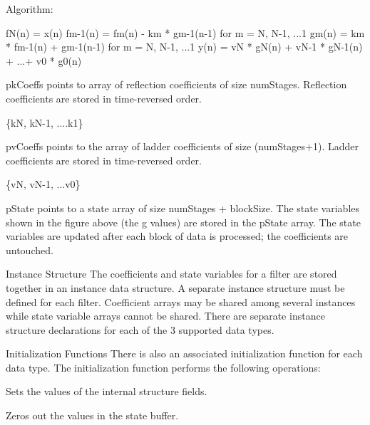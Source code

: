 \begin{DoxyParagraph}{Algorithm\-: }
 
\begin{DoxyPre}    
     fN(n)   =  x(n)    
     fm-1(n) = fm(n) - km * gm-1(n-1)   for m = N, N-1, ...1    
     gm(n)   = km * fm-1(n) + gm-1(n-1) for m = N, N-1, ...1    
     y(n)    = vN * gN(n) + vN-1 * gN-1(n) + ...+ v0 * g0(n)    
  \end{DoxyPre}
 
\end{DoxyParagraph}
\begin{DoxyParagraph}{}
{\ttfamily pk\-Coeffs} points to array of reflection coefficients of size {\ttfamily num\-Stages}. Reflection coefficients are stored in time-\/reversed order. 
\end{DoxyParagraph}
\begin{DoxyParagraph}{}

\begin{DoxyPre}    
     \{kN, kN-1, ....k1\}    
  \end{DoxyPre}
 {\ttfamily pv\-Coeffs} points to the array of ladder coefficients of size {\ttfamily (num\-Stages+1)}. Ladder coefficients are stored in time-\/reversed order. 
\end{DoxyParagraph}
\begin{DoxyParagraph}{}

\begin{DoxyPre}    
     \{vN, vN-1, ...v0\}    
  \end{DoxyPre}
 {\ttfamily p\-State} points to a state array of size {\ttfamily num\-Stages + block\-Size}. The state variables shown in the figure above (the g values) are stored in the {\ttfamily p\-State} array. The state variables are updated after each block of data is processed; the coefficients are untouched. 
\end{DoxyParagraph}
\begin{DoxyParagraph}{Instance Structure }
The coefficients and state variables for a filter are stored together in an instance data structure. A separate instance structure must be defined for each filter. Coefficient arrays may be shared among several instances while state variable arrays cannot be shared. There are separate instance structure declarations for each of the 3 supported data types.
\end{DoxyParagraph}
\begin{DoxyParagraph}{Initialization Functions }
There is also an associated initialization function for each data type. The initialization function performs the following operations\-:
\begin{DoxyItemize}
\item Sets the values of the internal structure fields.
\item Zeros out the values in the state buffer.
\end{DoxyItemize}
\end{DoxyParagraph}
